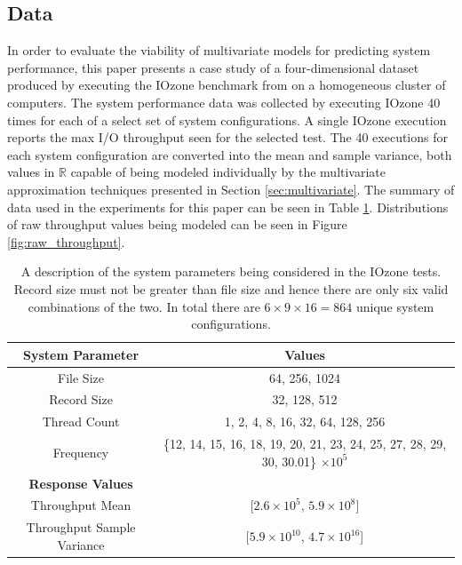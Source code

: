 \documentclass{scspaperproc}
\theoremstyle{scsthe}
\begin{document}
\subsection{Data}
In order to evaluate the viability of multivariate models for
predicting system performance, this paper presents a case study of a
four-dimensional dataset produced by executing the IOzone benchmark
from  on a homogeneous cluster of computers. The
system performance data was collected by executing IOzone 40 times for
each of a select set of system configurations. A single IOzone
execution reports the max I/O throughput seen for the selected
test. The 40 executions for each system configuration are converted
into the mean and sample variance, both values in $\mathbb{R}$ capable
of being modeled individually by the multivariate approximation
techniques presented in Section \ref{sec:multivariate}. The summary of
data used in the experiments for this paper can be seen in Table
\ref{tab:data_type}.  Distributions of raw throughput values being
modeled can be seen in Figure \ref{fig:raw_throughput}.

\begin{table}
  \centering
  \begin{tabular}{c|c}
    \hline
    \textbf{System Parameter} & \textbf{Values}\\
    \hline
    File Size & 64, 256, 1024\\
    Record Size & 32, 128, 512\\
    Thread Count & 1, 2, 4, 8, 16, 32, 64, 128, 256\\
    Frequency & \{12, 14, 15, 16, 18, 19, 20, 21, 23, 24, 25, 27, 28, 29, 30, 30.01\} $\times 10^5$\\
    \hline
    \textbf{Response Values} & \\
    \hline
    Throughput Mean & [$2.6 \times 10^5$, $5.9 \times 10^8$]\\
    Throughput Sample Variance & [$5.9\times 10^{10} $, $4.7 \times 10^{16}$]\\
    \hline
  \end{tabular}
  \caption{A description of the system parameters being considered in
    the IOzone tests. Record size must not be greater than file size
    and hence there are only six valid combinations of the two. In
    total there are $6 \times 9 \times 16 = 864$ unique system
    configurations.}
  \label{tab:data_type}
\end{table}
\end{document}
